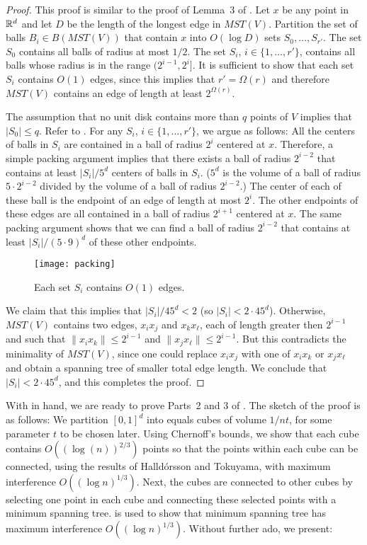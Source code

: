 \documentclass{patmorin}
\newcommand{\mst}{\mathit{MST}}
\begin{document}
\begin{proof}
This proof is similar to the proof of Lemma~3 of \cite{msz11}. Let $x$
be any point in $\mathbb{R}^d$ and let $D$ be the length of the longest edge in
$\mst(V)$.  Partition the set of balls $B_i\in B(\mst(V))$ that contain
$x$ into $O(\log D)$ sets $S_0,\ldots,S_{r'}$. The set $S_0$ contains
all balls of radius at most $1/2$.  The set $S_i$, $i\in\{1,\ldots,r'\}$,
contains all balls whose radius is in the range $(2^{i-1},2^i]$.  It is
sufficient to show that each set $S_i$ contains $O(1)$ edges, since this
implies that $r'=\Omega(r)$ and therefore $\mst(V)$ contains an edge
of length at least $2^{\Omega(r)}$.

The assumption that no unit disk contains more than $q$ points of $V$
implies that $|S_0|\le q$.  Refer to .  For any $S_i$,
$i\in\{1,\ldots,r'\}$, we argue as follows:  All the centers of balls
in $S_i$ are contained in a ball of radius $2^{i}$ centered at $x$.
Therefore, a simple packing argument implies that there exists a ball
of radius $2^{i-2}$ that contains at least $|S_i|/5^d$ centers of balls
in $S_i$.  ($5^d$ is the volume of a ball of radius $5\cdot2^{i-2}$
divided by the volume of a ball of radius $2^{i-2}$.)  The center of
each of these ball is the endpoint of an edge of length at most $2^i$.
The other endpoints of these edges are all contained in a ball of radius
$2^{i+1}$ centered at $x$.  The same packing argument shows that we can
find a ball of radius $2^{i-2}$ that contains at least $|S_i|/(5\cdot
9)^d$ of these other endpoints.

\begin{figure}
  \begin{center}
    \texttt{[image: packing]}
  \end{center}
  \caption{Each set $S_i$ contains $O(1)$ edges.}
\end{figure}

We claim that this implies that $|S_i|/45^d< 2$ (so $|S_i|< 2\cdot
45^d$). Otherwise, $\mst(V)$ contains two edges, $x_ix_j$ and
$x_kx_\ell$, each of length greater then $2^{i-1}$ and such that
$\|x_ix_k\| \le 2^{i-1}$ and $\|x_jx_\ell\|\le 2^{i-1}$.  But this
contradicts the minimality of $\mst(V)$, since one could replace
$x_ix_j$ with one of $x_ix_k$ or $x_jx_\ell$ and obtain a spanning tree
of smaller total edge length.  We conclude that $|S_i|< 2\cdot 45^d$,
and this completes the proof.
\end{proof}

With  in hand, we are ready to prove Parts~2 and 3 of
.  The sketch of the proof is as follows:  We partition
$[0,1]^d$ into equals cubes of volume $1/nt$, for some parameter $t$ to be
chosen later.  Using Chernoff's bounds, we show that each cube contains
$O((\log(n))^{2/3})$ points so that the points within each cube can be
connected, using the results of Halld\'orsson and Tokuyama, with maximum
interference $O((\log n)^{1/3})$.  Next, the cubes are connected to other
cubes by selecting one point in each cube and connecting these selected
points with a minimum spanning tree.   is used to show that
minimum spanning tree has maximum interference $O((\log n)^{1/3})$.
Without further ado, we present:
\end{document}
